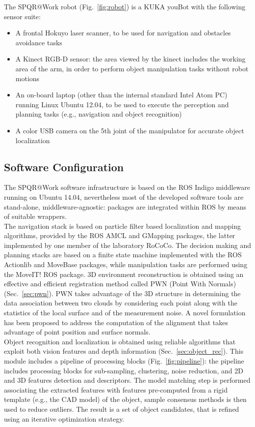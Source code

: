 \documentclass[conference]{IEEEtran}
\begin{document}
The SPQR@Work robot (Fig.~\ref{fig:robot}) is a KUKA youBot with the following sensor suite:

\begin{itemize}
 \item A frontal Hokuyo laser scanner, to be used for navigation and obstacles avoidance tasks
 \item A Kinect RGB-D sensor: the area viewed by the kinect includes the working area of the arm, in order to perform object manipulation tasks without robot motions
 \item An on-board laptop (other than the internal standard Intel Atom PC) running Linux Ubuntu 12.04, to be used to execute the perception and planning tasks (e.g., navigation and object recognition)
 \item A color USB camera on the 5th joint of the manipulator for accurate object localization
\end{itemize}
 
\subsection{Software Configuration}

The SPQR@Work software infrastructure is based on the ROS Indigo middleware running on Ubuntu 14.04, nevertheless most of the developed software tools are stand-alone, middleware-agnostic: packages are integrated within ROS by means of suitable wrappers.\\
The navigation stack is based on particle filter based localization and mapping algorithms, provided by the ROS AMCL and GMapping packages, the latter implemented by one member of the laboratory RoCoCo. The decision making and planning stacks are based on a finite state machine implemented with the ROS Actionlib and MoveBase packages, while manipulation tasks are performed using the MoveIT! ROS package.
3D environment reconstruction is obtained using an effective and efficient registration method called PWN (Point With Normals) (Sec.~\ref{sec:pwn}). 
PWN takes advantage of the 3D structure in determining the data association between two clouds by considering each point along with the statistics of the local surface and of the measurement noise. A novel formulation has been proposed to address the computation of the alignment that takes advantage of point position and surface normals.\\

Object recognition and localization is obtained using reliable algorithms that exploit both vision features and depth information (Sec.~\ref{sec:object_rec}). This module includes a pipeline of processing blocks (Fig.~\ref{fig:pipeline}): the pipeline includes processing blocks for sub-sampling, clustering, noise reduction, and 2D and 3D features detection and descriptors. The model matching step is performed associating the extracted features with features pre-computed from a rigid template (e.g., the CAD model) of the object, sample consensus methods is then used to reduce outliers. The result is a set of object candidates, that is refined using an iterative optimization strategy. 
\end{document}
